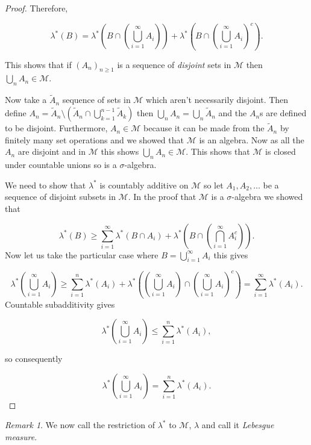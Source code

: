 \documentclass[
]{book}
\theoremstyle{definition}
\theoremstyle{definition}
\theoremstyle{definition}
\theoremstyle{definition}
\theoremstyle{remark}
\newtheorem*{remark}{Remark}
\begin{document}
\begin{proof}
Therefore,

\[ \lambda^*(B) =  \lambda^* \left( B \cap \left( \bigcup_{i=1}^\infty A_i \right) \right) + \lambda^* \left( B \cap \left( \bigcup_{i=1}^\infty A_i \right)^c \right). \]

This shows that if \((A_n)_{n \geq 1}\) is a sequence of \emph{disjoint} sets in \(\mathscr{M}\) then \(\bigcup_n A_n \in \mathscr{M}\).

Now take a \(\tilde{A}_n\) sequence of sets in \(\mathscr{M}\) which aren't necessarily disjoint. Then define \(A_n = \tilde{A}_n \setminus \left( \tilde{A}_n \cap \bigcup_{k=1}^{n-1} \tilde{A}_k\right)\) then \(\bigcup_n A_n = \bigcup_n \tilde{A}_n\) and the \(A_n\)s are defined to be disjoint. Furthermore, \(A_n \in \mathscr{M}\) because it can be made from the \(\tilde{A}_n\) by finitely many set operations and we showed that \(\mathscr{M}\) is an algebra. Now as all the \(A_n\) are disjoint and in \(\mathscr{M}\) this shows \(\bigcup_n A_n \in \mathscr{M}\). This shows that \(\mathscr{M}\) is closed under countable unions so is a \(\sigma\)-algebra.

We need to show that \(\lambda^*\) is countably additive on \(\mathscr{M}\) so let \(A_1, A_2, \dots\) be a sequence of disjoint subsets in \(\mathscr{M}\). In the proof that \(\mathscr{M}\) is a \(\sigma\)-algebra we showed that

\[ \lambda^*(B) \geq \sum_{i=1}^\infty \lambda^*(B \cap A_i) + \lambda^* \left( B \cap \left( \bigcap_{i=1}^\infty A_i^c \right) \right). \]
Now let us take the particular case where \(B = \bigcup_{i=1}^\infty A_i\) this gives

\[ \lambda^* \left( \bigcup_{i=1}^\infty A_i \right) \geq \sum_{i=1}^n \lambda^*(A_i) + \lambda^* \left(\left( \bigcup_{i=1}^\infty A_i \right) \cap \left( \bigcup_{i=1}^\infty A_i \right)^c \right) = \sum_{i=1}^\infty \lambda^* (A_i). \]
Countable subadditivity gives

\[ \lambda^* \left( \bigcup_{i=1}^\infty A_i \right) \leq \sum_{i=1}^n \lambda^*(A_i),  \]

so consequently

\[ \lambda^* \left( \bigcup_{i=1}^\infty A_i \right) = \sum_{i=1}^n \lambda^*(A_i).  \]
\end{proof}

\begin{remark}
We now call the restriction of \(\lambda^*\) to \(\mathscr{M}\), \(\lambda\) and call it \emph{Lebesgue measure}.
\end{remark}
\end{document}
